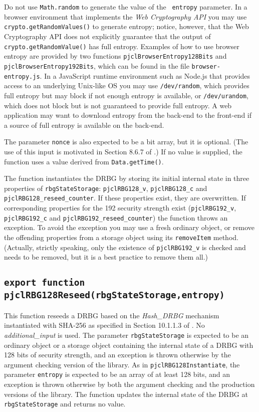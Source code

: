 \documentclass[12pt]{article}
\begin{document}
Do not use {\tt Math.random} to generate the value of the {\tt
  entropy} parameter.  In a browser environment that
implements the {\em Web Cryptography API\/} you may use
{\tt crypto.getRandomValues()} to generate entropy;
notice, however, that the Web Cryptography API
does not explicitly guarantee that the output of {\tt
  crypto.getRandomValue()} has full entropy.  
Examples of how to use browser entropy
are provided by two functions {\tt pjclBrowserEntropy128Bits}
and {\tt pjclBrowserEntropy192Bits}, which
can be found in the file {\tt browser-entropy.js}.
In a JavaScript runtime environment such as Node.js 
that provides access to an underlying Unix-like OS you may
use {\tt /dev/random}, which provides full entropy but
may block if not enough entropy is available, or {\tt /dev/urandom},
which does not block but is not guaranteed to provide full entropy.  A
web application may want to download entropy from the back-end to the
front-end if a source of full entropy is available on the back-end.

The parameter {\tt nonce} is also expected to be a bit array, but it is optional.  
(The use of this input is motivated in Section 8.6.7 of \cite{SP800-90Ar1}.)  If no value is
supplied, the function uses a value derived from {\tt Data.getTime()}.

The function instantiates the DRBG by storing its initial internal
state in three properties of {\tt rbgStateStorage}: {\tt pjclRBG128\_v}, 
{\tt pjclRBG128\_c} and {\tt pjclRBG128\_reseed\_counter}.  If these
properties exist, they are overwritten.  If corresponding properties for
the 192 security strength exist ({\tt pjclRBG192\_v}, {\tt pjclRBG192\_c}
and {\tt pjclRBG192\_reseed\_counter}) the function 
throws an exception.  To avoid the exception you may use a fresh ordinary
object, or remove the offending properties from a storage object
using its {\tt removeItem} method.  (Actually, strictly speaking, only the existence of
{\tt pjclRBG192\_v} is checked and needs to be
removed, but it is a best practice to remove them all.)

\subsection{\tt export function pjclRBG128Reseed(rbgStateStorage,entropy)}

This function reseeds a DRBG based on the {\em Hash\_DRBG\/} mechanism
instantiated with SHA-256 as specified in Section
10.1.1.3 of \cite{SP800-90Ar1}.  No {\em additional\_input\/} is used.
The parameter {\tt rbgStateStorage} is expected to be an ordinary
object or a storage object 
containing the internal state of a DRBG with 128 bits of security strength,
and an exception is thrown otherwise by the argument checking version of the library.
As in {\tt pjclRBG128Instantiate}, the parameter {\tt entropy} is
expected to be an array of at least 128 bits, and an exception is thrown otherwise by both the
argument checking and the production versions of the library.  The
function updates the internal state of the DRBG at {\tt
  rbgStateStorage} and returns no value.
\end{document}
